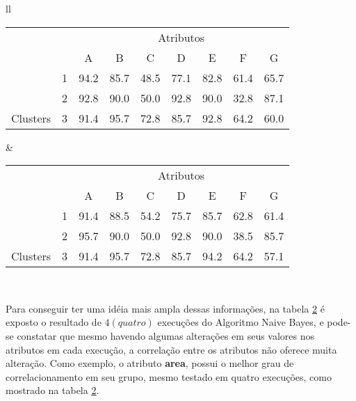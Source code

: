 \begin{table}[!h]
\begin{tabular}{ll}
   \small\addtolength{\tabcolsep}{-4pt}
   \begin{tabular}{|cl|c|c|c|c|c|c|c|}
        \hline \hline
                                 &   & \multicolumn{7}{c|}{Atributos}                                               \\ \cline{3-9} 
       \multicolumn{1}{|l}{}                            &   & A    & B & C & D & E & F & G \\ \hline
        \multicolumn{1}{|c|}{}                           & 1 & 94.2 & 85.7   & 48.5      & 77.1 & 82.8 & 61.4   & 65.7   \\ \cline{2-9} 
        \multicolumn{1}{|c|}{}                           & 2 & 92.8 & 90.0   & 50.0      & 92.8 & 90.0 & 32.8  & 87.1  \\ \cline{2-9} 
        \multicolumn{1}{|c|}{\multirow{-3}{*}{Clusters}} & 3 & 91.4 & 95.7   & 72.8      & 85.7 & 92.8 & 64.2  & 60.0  \\ \hline
   \end{tabular}
    
    &
    
       \small\addtolength{\tabcolsep}{-4pt}
   \begin{tabular}{|cl|c|c|c|c|c|c|c|}
        \hline \hline
                                 &   & \multicolumn{7}{c|}{Atributos}                                               \\ \cline{3-9} 
       \multicolumn{1}{|l}{}                            &   & A    & B & C & D & E & F & G \\ \hline
        \multicolumn{1}{|c|}{}                           & 1 & 91.4 & 88.5   & 54.2      & 75.7 & 85.7 & 62.8   & 61.4   \\ \cline{2-9} 
        \multicolumn{1}{|c|}{}                           & 2 & 95.7 & 90.0   & 50.0      & 92.8 & 90.0 & 38.5  & 85.7  \\ \cline{2-9} 
        \multicolumn{1}{|c|}{\multirow{-3}{*}{Clusters}} & 3 & 91.4 & 95.7   & 72.8      & 85.7 & 94.2 & 64.2  & 57.1  \\ \hline
   \end{tabular}
   \\
 
 \end{tabular}
 \label{tab:execucoes:seed:nb}
\end{table}

Para conseguir ter uma idéia mais ampla dessas informações, na tabela \ref{tab:execucoes:seed:nb} é exposto o resultado de ${4(quatro)}$ execuções do Algoritmo Naive Bayes, e pode-se constatar que mesmo havendo algumas alterações em seus valores nos atributos em cada execução, a correlação entre os atributos não oferece muita alteração. Como exemplo, o atributo \textbf{area}, possui o melhor grau de correlacionamento em seu grupo, mesmo testado em quatro execuções, como mostrado na tabela \ref{tab:execucoes:seed:nb}.

